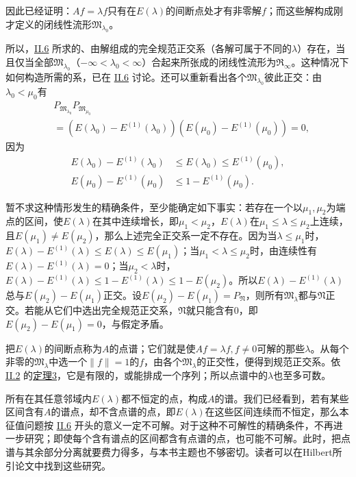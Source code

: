 \documentclass[fontsize=13pt,twoside,openany,headings=normal,parskip=false,bookmarkpackage=false,DIV=calc]{scrbook}
\begin{document}
因此已经证明：$Af=\lambda f$只有在$E(\lambda)$的间断点处才有非零解$f$；而这些解构成刚才定义的闭线性流形$\mathfrak{M}_{\lambda_0}$。

所以，\hyperref[sec:II.6]{II.6} 所求的、由解组成的完全规范正交系（各解可属于不同的$\lambda$）存在，当且仅当全部$\mathfrak{M}_{\lambda_0}$（$-\infty<\lambda_0<\infty$）合起来所张成的闭线性流形为$\mathfrak{R}_\infty$。这种情况下如何构造所需的系，已在 \hyperref[sec:II.6]{II.6} 讨论。还可以重新看出各个$\mathfrak{M}_{\lambda_0}$彼此正交：由$\lambda_0<\mu_0$有
\begin{align*}
&P_{\mathfrak{M}_{\lambda_0}}P_{\mathfrak{M}_{\mu_0}}\\
&=(E(\lambda_0)-E^{(1)}(\lambda_0))(E(\mu_0)-E^{(1)}(\mu_0))=0,
\end{align*}
因为
\begin{align*}
E(\lambda_0)-E^{(1)}(\lambda_0)&\leq E(\lambda_0)\leq E^{(1)}(\mu_0),\\
E(\mu_0)-E^{(1)}(\mu_0)&\leq1-E^{(1)}(\mu_0).
\end{align*}

\hypertarget{origpage-65}{}\label{origpage-65}暂不求这种情形发生的精确条件，至少能确定如下事实：若存在一个以$\mu_1,\allowbreak \mu_2$为端点的区间，使$E(\lambda)$在其中连续增长，即$\mu_1<\mu_2$，$E(\lambda)$在$\mu_1\leq\lambda\leq\mu_2$上连续，且$E(\mu_1)\ne E(\mu_2)$，那么上述完全正交系一定不存在。因为当$\lambda\leq\mu_1$时，$E(\lambda)-E^{(1)}(\lambda)\leq E(\lambda)\leq E(\mu_1)$；当$\mu_1<\lambda\leq\mu_2$时，由连续性有$E(\lambda)-E^{(1)}(\lambda)=0$；当$\mu_2<\lambda$时，$E(\lambda)-E^{(1)}(\lambda)\leq1-E^{(1)}(\lambda)\leq1-E(\mu_2)$。所以$E(\lambda)-E^{(1)}(\lambda)$总与$E(\mu_2)-E(\mu_1)$正交。设$E(\mu_2)-E(\mu_1)=P_{\mathfrak{N}}$，则所有$\mathfrak{M}_\lambda$都与$\mathfrak{N}$正交。若能从它们中选出完全规范正交系，$\mathfrak{N}$就只能含有$0$，即$E(\mu_2)-E(\mu_1)=0$，与假定矛盾。

把$E(\lambda)$的间断点称为$A$的点谱；它们就是使$Af=\lambda f,\allowbreak f\ne0$可解的那些$\lambda$。从每个非零的$\mathfrak{M}_\lambda$中选一个$\|f\|=1$的$f$，由各个$\mathfrak{M}_\lambda$的正交性，便得到规范正交系。依 \hyperref[sec:II.2]{II.2} 的\CJKglue \hyperref[thm:II.3infty]{定理3}，它是有限的，或能排成一个序列；所以点谱中的$\lambda$也至多可数。

所有在其任意邻域内$E(\lambda)$都不恒定的点，构成$A$的谱。我们已经看到，若有某些区间含有$A$的谱点，却不含点谱的点，即$E(\lambda)$在这些区间连续而不恒定，那么本征值问题按 \hyperref[sec:II.6]{II.6} 开头的意义一定不可解。对于这种不可解性的精确条件，不再进一步研究；即使每个含有谱点的区间都含有点谱的点，也可能不可解。此时，把点谱与其余部分分离就要费力得多，与本书主题也不够密切。读者可以在Hilbert所引论文中找到这些研究。
\end{document}
